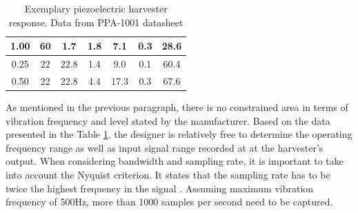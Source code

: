 \documentclass[12pt,a4paper]{article}
\begin{document}
\begin{table}[ht!]
\begin{tabular}{|c|c|c|c|c|c|c|}
1.00                                                                                                 & 60                                                                                     & 1.7                                                                                     & 1.8                                                                                    & 7.1                                                                                     & 0.3                                                                                      & 28.6                                                                 \\ \hline
0.25                                                                                                 & 22                                                                                     & 22.8                                                                                    & 1.4                                                                                    & 9.0                                                                                     & 0.1                                                                                      & 60.4                                                                 \\
0.50                                                                                                 & 22                                                                                     & 22.8                                                                                    & 4.4                                                                                    & 17.3                                                                                    & 0.3                                                                                      & 67.6                                                                 \\ \hline

\end{tabular}
\caption{Exemplary piezoelectric harvester response. Data from PPA-1001 datasheet \cite{PPA}}
\label{tab:ppapower}
\end{table}

As mentioned in the previous paragraph, there is no constrained area in terms of vibration frequency and level stated by the manufacturer. Based on the data presented in the Table \ref{tab:ppapower}, the designer is relatively free to determine the operating frequency range as well as input signal range recorded at at the harvester's output. When considering bandwidth and sampling rate, it is important to take into account the Nyquist criterion. It states that the sampling rate has to be twice the highest frequency in the signal \cite{ElEx}. Assuming maximum vibration frequency of 500Hz, more than 1000 samples per second need to be captured.
\par
\end{document}
